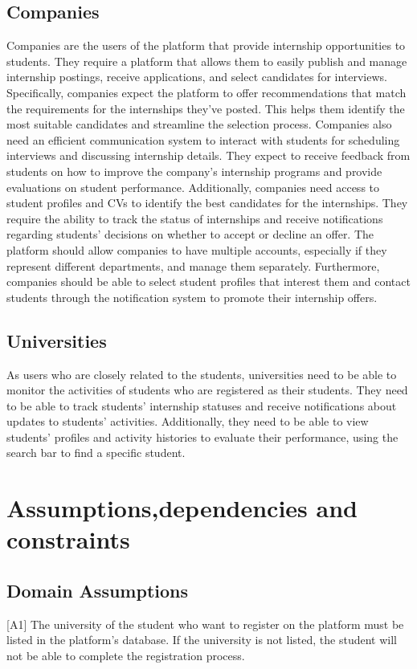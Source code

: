 \subsection{Companies}
Companies are the users of the platform that provide internship opportunities to students. They require a platform that allows them to easily publish and 
manage internship postings, receive applications, and select candidates for interviews. Specifically, companies expect the platform to offer recommendations 
that match the requirements for the internships they’ve posted. This helps them identify the most suitable candidates and streamline the selection process.
Companies also need an efficient communication system to interact with students for scheduling interviews and discussing internship details. 
They expect to receive feedback from students on how to improve the company’s internship programs and provide evaluations on student performance.
Additionally, companies need access to student profiles and CVs to identify the best candidates for the internships. 
They require the ability to track the status of internships and receive notifications regarding students' decisions on whether to accept or decline an offer.
The platform should allow companies to have multiple accounts, especially if they represent different departments, and manage them separately. 
Furthermore, companies should be able to select student profiles that interest them and contact students through the notification system to promote their 
internship offers.

\subsection{Universities}
As users who are closely related to the students, universities need to be able to monitor the activities of students who are registered as their students.
They need to be able to track students' internship statuses and receive notifications about updates to students' activities. Additionally, they need to 
be able to view students' profiles and activity histories to evaluate their performance, using the search bar to find a specific student.

\section{Assumptions,dependencies and constraints}\label{subsec:assumptions_dependencies_constraints}
\subsection{Domain Assumptions}
[A1] The university of the student who want to register on the platform must be listed in the platform's database. If the university is not listed, the student
will not be able to complete the registration process.

